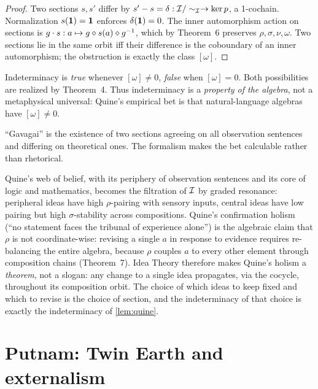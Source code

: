 \begin{proof}
Two sections $s, s'$ differ by $s' - s = \delta : \mathcal{I}/\sim_{\mathcal{I}}\to
\ker p$, a 1-cochain. Normalization $s(\mathbf{1}) = \mathbf{1}$ enforces
$\delta(\mathbf{1})=0$. The inner automorphism action on sections is
$g\cdot s : a \mapsto g\mathbin{\diamond} s(a)\mathbin{\diamond} g^{-1}$, which by
Theorem~6 preserves $\rho, \sigma, \nu, \omega$. Two sections lie in
the same orbit iff their difference is the coboundary of an inner
automorphism; the obstruction is exactly the class $[\omega]$.
\end{proof}

\formalstatus Indeterminacy is \emph{true} whenever $[\omega]\neq 0$,
\emph{false} when $[\omega]=0$. Both possibilities are realized by
Theorem~4. Thus indeterminacy is a \emph{property of the algebra}, not
a metaphysical universal: Quine's empirical bet is that
natural-language algebras have $[\omega]\neq 0$.

\litcomment ``Gavagai'' is the existence of two sections agreeing on
all observation sentences and differing on theoretical ones. The
formalism makes the bet calculable rather than rhetorical.

Quine's web of belief, with its periphery of observation sentences and
its core of logic and mathematics, becomes the filtration of $\mathcal{I}$
by graded resonance: peripheral ideas have high $\rho$-pairing with
sensory inputs, central ideas have low pairing but high
$\sigma$-stability across compositions. Quine's confirmation holism
(``no statement faces the tribunal of experience alone'') is the
algebraic claim that $\rho$ is not coordinate-wise: revising a single
$a$ in response to evidence requires re-balancing the entire algebra,
because $\rho$ couples $a$ to every other element through composition
chains (Theorem~7). Idea Theory therefore makes Quine's holism a
\emph{theorem}, not a slogan: any change to a single idea propagates,
via the cocycle, throughout its composition orbit. The choice of
which ideas to keep fixed and which to revise is the choice of
section, and the indeterminacy of that choice is exactly the
indeterminacy of \cref{lem:quine}.

\section{Putnam: Twin Earth and externalism}\label{sec:putnam}


